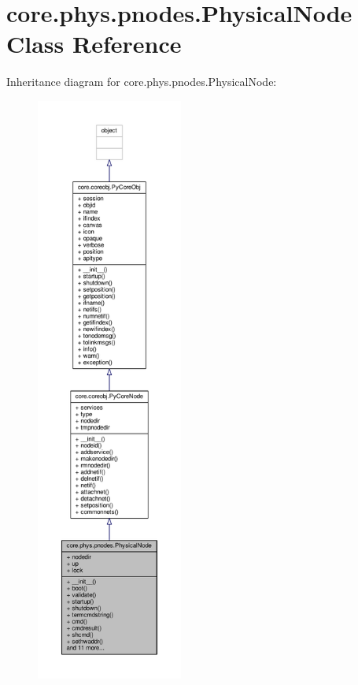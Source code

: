 \hypertarget{classcore_1_1phys_1_1pnodes_1_1_physical_node}{\section{core.\+phys.\+pnodes.\+Physical\+Node Class Reference}
\label{classcore_1_1phys_1_1pnodes_1_1_physical_node}
}


Inheritance diagram for core.\+phys.\+pnodes.\+Physical\+Node\+:
\nopagebreak
\begin{figure}[H]
\begin{center}
\leavevmode
\includegraphics[height=550pt]{classcore_1_1phys_1_1pnodes_1_1_physical_node__inherit__graph}
\end{center}
\end{figure}


